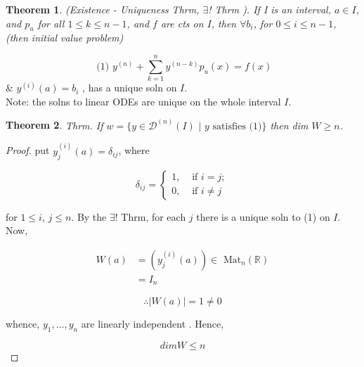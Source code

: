 \documentclass{article}
\newtheorem*{theorem}{Theorem}
\theoremstyle{definition}
\begin{document}



\begin{theorem}
  (Existence - Uniqueness Thrm, \( \exists \)! Thrm ). If I is an
  interval, \( a \in I \), and \( p_u \) for all \( 1 \leq k \leq n-1 \),
  and \( f \) are cts on \( I \), then 
  \( \forall b_i \), for \( 0 \leq i \leq n-1 \), (then initial value problem)  
\end{theorem}

\[ \text{ (1) } y^{(n)} + \sum_{k=1}^n y^{(n-k)} p_u(x) = f(x) \]
\& \( y^{(i)} (a) = b_i  \) , has a unique soln on \( I \). \\
Note: the solns to linear ODEs are unique on the whole interval \( I
\).\\[5mm]

\begin{theorem}
  Thrm. If \( w = \{ y \in \mathscr{D}^{(n)} (I) \text{ | } y \text{ satisfies (1)}
  \} \) then
  dim \( W \geq n \). \\[5mm]
\end{theorem}

\begin{proof}
  put \( y^{(i)}_j (a) = \delta_{ij} \),  where

  \[ 
  \delta_{ij} =
  \begin{cases}
    1, & \text{ if } i = j; \\
    0, & \text{ if } i \neq j
  \end{cases}
  \]

  for \( 1 \leq i \), \( j \leq n \). By the \( \exists \)! Thrm, for each
  \( j \) there is a unique soln to (1) on \( I \). Now, 

  \begin{align*}
    W(a) &= (y_j^{(i)}(a) ) \in \text{ Mat}_n( \mathbb{R}) \\
    &= I_n
  \end{align*}

  \[ \therefore |W(a)|=1 \neq 0 \]

  whence, \( y_1, \dots , y_n \) are linearly independent . Hence,

  \[ dim W \leq n  \]
\end{proof}
\end{document}
